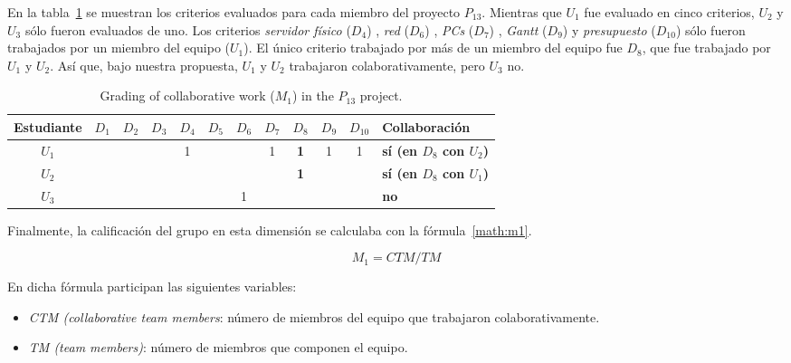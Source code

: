 En la tabla~\ref{table:13-project-grades} se muestran los criterios evaluados para cada miembro del proyecto $P_{13}$. Mientras que $U_1$ fue evaluado en cinco criterios, $U_2$ y $U_3$ sólo fueron evaluados de uno. Los criterios \emph{servidor físico} ($D_4$) , \emph{red} ($D_6$) , \emph{PCs} ($D_7$) , \emph{Gantt} ($D_9$) y \emph{presupuesto} ($D_10$) sólo fueron trabajados por un miembro del equipo ($U_1$). El único criterio trabajado por más de un miembro del equipo fue $D_8$, que fue trabajado por $U_1$ y $U_2$. Así que, bajo nuestra propuesta, $U_1$ y $U_2$ trabajaron colaborativamente, pero $U_3$ no.

\begin{table}[h]
\centering
\begin{tabular}{|c|c|c|c|c|c|c|c|c|c|c|l|}
\hline
\textbf{Estudiante} & \textbf{$D_1$} & \textbf{$D_2$} & \textbf{$D_3$} & \textbf{$D_4$} & \textbf{$D_5$} & \textbf{$D_6$} & \textbf{$D_7$} & \textbf{$D_8$} & \textbf{$D_9$} & \textbf{$D_{10}$} & \textbf{Collaboración} \\ \hline
\hline
$U_1$ &   &   &   & 1 &   &     & 1   & \textbf{1}  & 1  & 1  & \textbf{sí (en $D_8$ con $U_2$)} \\ \hline
$U_2$ &   &   &   &    &   &     &      & \textbf{1}    &      &       & \textbf{sí (en $D_8$ con $U_1$)} \\ \hline
$U_3$ &   &   &   &    &   & 1  &     &      &      &       & \textbf{no} \\ \hline
\end{tabular}
\caption{Grading of collaborative work ($M_1$) in the $P_{13}$ project.}
\label{table:13-project-grades}
\end{table}

Finalmente, la calificación del grupo en esta dimensión se calculaba con la fórmula~\ref{math:m1}. 

\begin{equation}
    \textbf{$M_1 = CTM/TM$}
    \label{math:m1}
\end{equation}

En dicha fórmula participan las siguientes variables:

\begin{itemize}	
	\item \emph{CTM (collaborative team members}: número de miembros del equipo que trabajaron colaborativamente.
	\item \emph{TM (team members)}: número de miembros que componen el equipo.
\end{itemize} 

